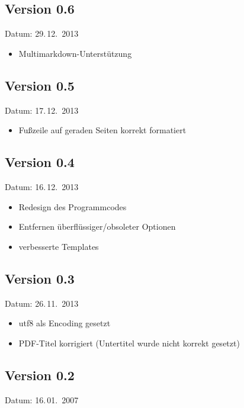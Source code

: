 \subsection{Version 0.6}

Datum: 29.\,12.~2013

\begin{itemize}
	\item Multimarkdown-Unterstützung
\end{itemize}

\subsection{Version 0.5}

Datum: 17.\,12.~2013

\begin{itemize}
	\item Fußzeile auf geraden Seiten korrekt formatiert
\end{itemize}

\subsection{Version 0.4}

Datum: 16.\,12.~2013

\begin{itemize}
	\item Redesign des Programmcodes
	\item Entfernen überflüssiger/obsoleter Optionen
	\item verbesserte Templates
\end{itemize}

\subsection{Version 0.3}

Datum: 26.\,11.~2013

\begin{itemize}
	\item utf8 als Encoding gesetzt
	\item PDF-Titel korrigiert (Untertitel wurde nicht korrekt gesetzt)
\end{itemize}

\subsection{Version 0.2}

Datum: 16.\,01.~2007

